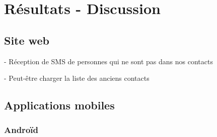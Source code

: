 \cleardoublepage



\chapter{Résultats - Discussion}


\section{Site web}

- Réception de SMS de personnes qui ne sont pas dans nos contacts

- Peut-être charger la liste des anciens contacts
\\






\section{Applications mobiles}


\subsection{Androïd}


